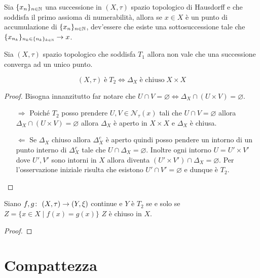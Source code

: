\begin{theorem}
	Sia $\{x_n\}_{n\in \mathbb{N}}$ una successione in $(X,\tau)$ spazio topologico di Hausdorff e che soddisfa il primo assioma di numerabilità, allora se $x \in X$ è un punto di accumulazione di $\{x_n\}_{n\in \mathbb{N}}$, dev'essere che esiste una sottosuccessione tale che $\{x_{n_k}\}_{n_k \in \{n_k\}_{k \in \mathbb{N}}} \rightarrow x$. 
\end{theorem}

\begin{remark}
	Sia $(X, \tau)$ spazio topologico che soddisfa $T_1$ allora non vale che una successione converga ad un unico punto.
\end{remark}

\begin{theorem}
	\begin{equation}
	(X, \tau) \; \text{è} \; T_2 \Leftrightarrow \Delta_{X} \; \text{è chiuso} \; X \times X
	\end{equation}
\end{theorem} 
\begin{proof}
	Bisogna innanzitutto far notare che $U \cap V = \varnothing \Leftrightarrow \Delta_X \cap (U \times V) = \varnothing$.
	\begin{enumerate}
		\item[$\Rightarrow$] Poiché $T_2$ posso prendere $U, V \in \mathcal{N}_\tau(x)$ tali che $U \cap V = \varnothing$ allora $\Delta_X \cap (U \times V) = \varnothing$ allora $\Delta_X$ è aperto in $X\times X$ e $\Delta_X$ è chiusa. 
		\item[$\Leftarrow$] Se $\Delta_X$ chiuso   allora $\Delta^c_X$ è aperto quindi posso pendere un intorno di un punto interno di $\Delta^c_X$ tale che $U \cap \Delta_X = \varnothing$. Inoltre ogni intorno $U = U' \times V'$ dove $U', V'$ sono intorni in $X$ allora diventa $(U' \times V') \cap \Delta_X = \varnothing$. Per l'osservazione iniziale risulta che esistono $U' \cap V' = \varnothing$ e dunque è $T_2$.
	\end{enumerate}
\end{proof}

\begin{theorem}
	Siano $f,g \colon\ (X,\tau) \rightarrow (Y,\xi)$ continue e $Y$ è $T_2$ se e solo se $Z = \{x \in X \; | \; f(x)=g(x) \}$ $Z$ è chiuso in $X$.
\end{theorem}
\begin{proof}
\end{proof}

\section{Compattezza}

